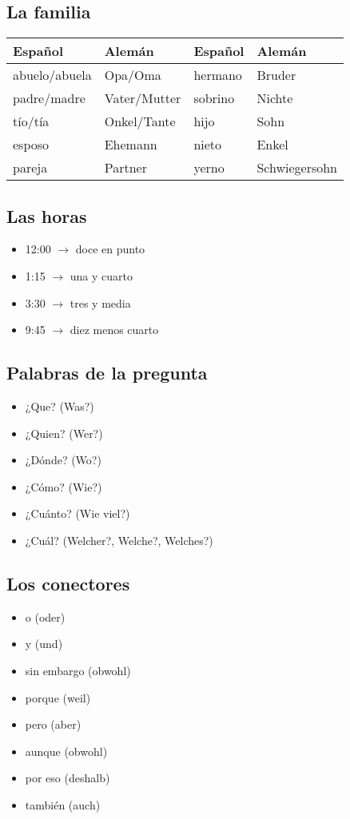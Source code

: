 \documentclass{article}
\begin{document}
	\subsection{La familia}
	
	\begin{center}
		\begin{tabular}{ll|ll}
			\textbf{Español} & \textbf{Alemán} & \textbf{Español} & \textbf{Alemán} \\
			\hline
			abuelo/abuela & Opa/Oma & hermano & Bruder \\
			padre/madre & Vater/Mutter & sobrino & Nichte \\
			tío/tía & Onkel/Tante & hijo & Sohn \\
			esposo & Ehemann & nieto & Enkel \\
			pareja & Partner & yerno & Schwiegersohn
		\end{tabular}
	\end{center}

	\subsection{Las horas}
	\begin{itemize}
		\item 12:00 $\to$ doce en punto
		\item 1:15 $\to$ una y cuarto
		\item 3:30 $\to$ tres y media
		\item 9:45 $\to$ diez menos cuarto
	\end{itemize}

	\subsection{Palabras de la pregunta}
	\begin{itemize}
		\item ¿Que? (Was?)
		\item ¿Quien? (Wer?)
		\item ¿Dónde? (Wo?)
		\item ¿Cómo? (Wie?)
		\item ¿Cuánto? (Wie viel?)
		\item ¿Cuál? (Welcher?, Welche?, Welches?)
	\end{itemize}

	\subsection{Los conectores}
	\begin{itemize}
		\item o (oder)
		\item y (und)
		\item sin embargo (obwohl)
		\item porque (weil)
		\item pero (aber)
		\item aunque (obwohl)
		\item por eso (deshalb)
		\item también (auch)
	\end{itemize}
	
\end{document}
